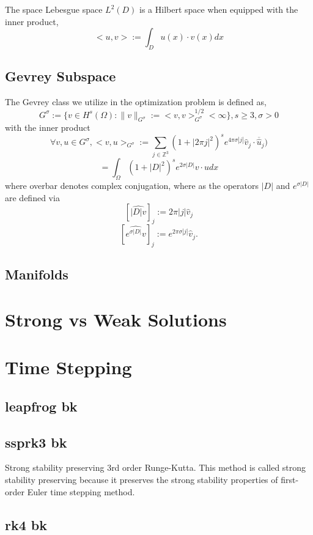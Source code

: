 \documentclass[12pt]{article}
\begin{document}
\begin{flushleft}
The space Lebesgue space $L^2(D)$ is a Hilbert space when equipped with the inner product,
$$<u,v> := \int_D u(x)\cdot v(x) dx$$

\subsection{Gevrey Subspace} 

The Gevrey class we utilize in the optimization problem is defined as,
$$G^\sigma := \{v\in H^s(\Omega):\|v\|_{G^\sigma}:= <v,v>_{G^\sigma}^{1/2}<\infty\}, s\geq 3, \sigma > 0$$
with the inner product
$$\forall v,u\in G^\sigma, <v,u>_{G^\sigma} := \sum_{j\in \mathbb{Z}^3} (1+|2\pi j|^2)^s e^{4\pi\sigma |j|}\hat{v}_j \cdot \overline{\hat{u}}_j)$$
$$ = \int_\Omega (1+|D|^2)^s e^{2\sigma |D|}v\cdot u dx$$
where overbar denotes complex conjugation, where as the operators $|D|$ and $e^{\sigma|D|}$ are defined via
$$\left[ \hat{|D|v} \right]_j := 2\pi|j|\hat{v}_j$$
$$\left[ \hat{e^{\sigma|D|}v} \right]_j := e^{2\pi\sigma |j|}\hat{v}_j.$$
\subsection{Manifolds}


\section{Strong vs Weak Solutions}

\section{Time Stepping}
\subsection{leapfrog bk}
\subsection{ssprk3 bk}
Strong stability preserving 3rd order Runge-Kutta. This method is called strong stability preserving because it preserves the strong stability properties of first-order Euler time stepping method.
\subsection{rk4 bk}


\end{flushleft}
\end{document}
